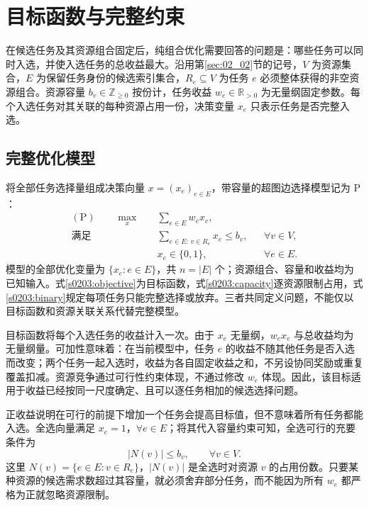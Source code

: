 \section{目标函数与完整约束}
\label{sec:02_03}

在候选任务及其资源组合固定后，纯组合优化需要回答的问题是：哪些任务可以同时入选，并使入选任务的总收益最大。沿用第\ref{sec:02_02}节的记号，$V$ 为资源集合，$E$ 为保留任务身份的候选索引集合，$R_e\subseteq V$ 为任务 $e$ 必须整体获得的非空资源组合。资源容量 $b_v\in\mathbb Z_{\geq0}$ 按份计，任务收益 $w_e\in\mathbb R_{>0}$ 为无量纲固定参数。每个入选任务对其关联的每种资源占用一份，决策变量 $x_e$ 只表示任务是否完整入选。

\subsection{完整优化模型}

将全部任务选择量组成决策向量 $x=(x_e)_{e\in E}$，带容量的超图边选择模型记为 $\mathrm P$：
\begin{subequations}
\label{s0203:primal}
\begin{align}
 (\mathrm P)\qquad
 \max_{x}\quad &\sum_{e\in E}w_e x_e,
 \label{s0203:objective}\\
 \text{满足}\quad
 &\sum_{e\in E:\,v\in R_e}x_e\leq b_v,
 &&\forall v\in V,
 \label{s0203:capacity}\\
 &x_e\in\{0,1\},
 &&\forall e\in E.
 \label{s0203:binary}
\end{align}
\end{subequations}
模型的全部优化变量为 $\{x_e:e\in E\}$，共 $n=|E|$ 个；资源组合、容量和收益均为已知输入。式\eqref{s0203:objective}为目标函数，式\eqref{s0203:capacity}逐资源限制占用，式\eqref{s0203:binary}规定每项任务只能完整选择或放弃。三者共同定义问题，不能仅以目标函数和资源关联关系代替完整模型。

目标函数将每个入选任务的收益计入一次。由于 $x_e$ 无量纲，$w_e x_e$ 与总收益均为无量纲量。可加性意味着：在当前模型中，任务 $e$ 的收益不随其他任务是否入选而改变；两个任务一起入选时，收益为各自固定收益之和，不另设协同奖励或重复覆盖扣减。资源竞争通过可行性约束体现，不通过修改 $w_e$ 体现。因此，该目标适用于收益已经按同一尺度确定、且可以逐任务相加的候选选择问题。

正收益说明在可行的前提下增加一个任务会提高目标值，但不意味着所有任务都能入选。全选向量满足 $x_e=1$，$\forall e\in E$；将其代入容量约束可知，全选可行的充要条件为
\begin{equation}
 |N(v)|\leq b_v,\qquad \forall v\in V.
 \label{s0203:all_selected}
\end{equation}
这里 $N(v)=\{e\in E:v\in R_e\}$，$|N(v)|$ 是全选时对资源 $v$ 的占用份数。只要某种资源的候选需求数超过其容量，就必须舍弃部分任务，而不能因为所有 $w_e$ 都严格为正就忽略资源限制。

